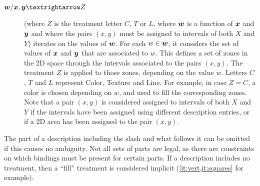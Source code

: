 \documentclass[version=last, pagesize, twoside=off, bibliography=totoc, DIV=calc, fontsize=12pt, a4paper, french, english]{scrartcl}
\begin{document}
\begin{description}
	\item[$\var{w}/\var{x}, \var{y}→Z$] (where $Z$ is the treatment letter $C$, $T$ or $L$, where ${\bm{w}}$ is a function of ${\bm{x}}$ and ${\bm{y}}$ and where the pairs $(x, y)$ must be assigned to intervals of both $X$ and $Y$) iterates on the values of ${\bm{w}}$. For each $w \in {\bm{w}}$, it considers the set of values of ${\bm{x}}$ and ${\bm{y}}$ that are associated to $w$. This defines a set of zones in the 2D space through the intervals associated to the pairs $(x, y)$. The treatment $Z$ is applied to those zones, depending on the value $w$. Letters $C$, $T$ and $L$ represent Color, Texture and Line. For example, in case $Z=C$, a color is chosen depending on $w$, and used to fill the corresponding zones. Note that a pair $(x, y)$ is considered assigned to intervals of both $X$ and $Y$ if the intervals have been assigned using different description entries, or if a 2D area has been assigned to the pair $(x, y)$. 
\end{description}
The part of a description including the slash and what follows it can be omitted if this causes no ambiguity. Not all sets of parts are legal, as there are constraints on which bindings must be present for certain parts. If a description includes no treatment, then a “fill” treatment is considered implicit (\cref{it:vert,it:squares} for example). 
\end{document}
